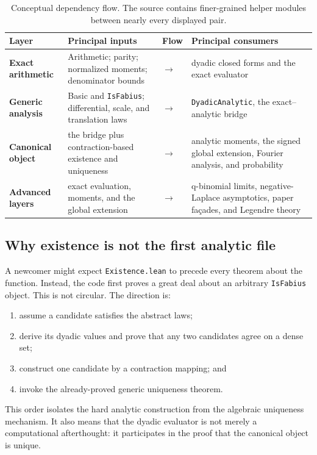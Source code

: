 \documentclass[11pt,oneside]{article}
\theoremstyle{definition}
\theoremstyle{remark}
\begin{document}
\begin{table}[htbp]
\centering
\small
\begin{tabularx}{\textwidth}{@{}>{\raggedright\arraybackslash\bfseries}p{} >{\raggedright\arraybackslash}X >{\centering\arraybackslash}p{} >{\raggedright\arraybackslash}X@{}}
\toprule
Layer & Principal inputs & Flow & Principal consumers \\
\midrule
Exact arithmetic & Arithmetic; parity; normalized moments; denominator bounds & $\longrightarrow$ & dyadic closed forms and the exact evaluator \\
Generic analysis & Basic and \nolinkurl{IsFabius}; differential, scale, and translation laws & $\longrightarrow$ & \nolinkurl{DyadicAnalytic}, the exact--analytic bridge \\
Canonical object & the bridge plus contraction-based existence and uniqueness & $\longrightarrow$ & analytic moments, the signed global extension, Fourier analysis, and probability \\
Advanced layers & exact evaluation, moments, and the global extension & $\longrightarrow$ & q-binomial limits, negative-Laplace asymptotics, paper façades, and Legendre theory \\
\bottomrule
\end{tabularx}
\caption{Conceptual dependency flow.  The source contains finer-grained helper modules between nearly every displayed pair.}
\end{table}

\subsection{Why existence is not the first analytic file}
A newcomer might expect \nolinkurl{Existence.lean} to precede every theorem about the function.  Instead, the code first proves a great deal about an arbitrary \nolinkurl{IsFabius} object.  This is not circular.  The direction is:
\begin{enumerate}
  \item assume a candidate satisfies the abstract laws;
  \item derive its dyadic values and prove that any two candidates agree on a dense set;
  \item construct one candidate by a contraction mapping; and
  \item invoke the already-proved generic uniqueness theorem.
\end{enumerate}
This order isolates the hard analytic construction from the algebraic uniqueness mechanism.  It also means that the dyadic evaluator is not merely a computational afterthought: it participates in the proof that the canonical object is unique.
\end{document}
